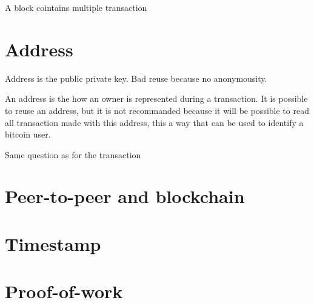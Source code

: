 \documentclass[letterpaper]{article}
\begin{document}
A block cointains multiple transaction


\section{Address}

Address is the public private key. Bad reuse because no anonymousity.

An address is the how an owner is represented during a transaction.
It is possible to reuse an address, but it is not recommanded because
it will be possible to read all transaction made with this address, this
a way that can be used to identify a bitcoin user.

Same question as for the transaction


\section{Peer-to-peer and blockchain}

\section{Timestamp}

\section{Proof-of-work}
\end{document}
